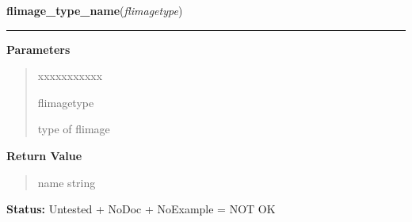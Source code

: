 \hspace{.8\funcindent}\begin{boxedminipage}{\funcwidth}

    \raggedright \textbf{flimage\_type\_name}(\textit{flimagetype})

    \vspace{-1.5ex}

    \rule{\textwidth}{0.5\fboxrule}
\setlength{\parskip}{2ex}
\setlength{\parskip}{1ex}
      \textbf{Parameters}
      \vspace{-1ex}

      \begin{quote}
        \begin{Ventry}{xxxxxxxxxxx}

          \item[flimagetype]

          type of flimage

        \end{Ventry}

      \end{quote}

      \textbf{Return Value}
    \vspace{-1ex}

      \begin{quote}
      name string

      \end{quote}

\textbf{Status:} Untested + NoDoc + NoExample = NOT OK



    \end{boxedminipage}

    \label{xformslib:library:flimage_add_text}

    \vspace{0.5ex}

